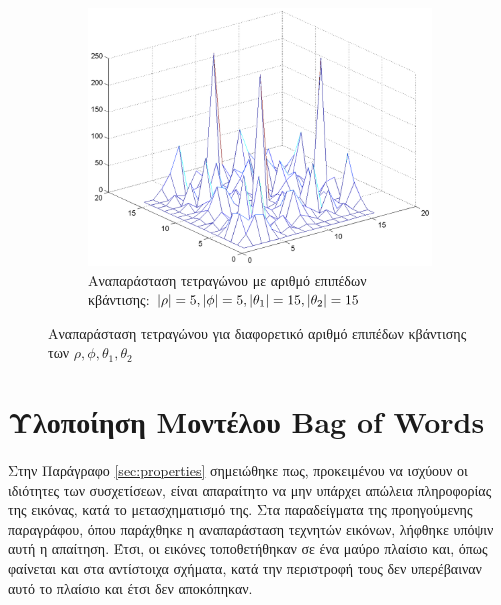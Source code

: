 \begin{figure}
\ContinuedFloat
        \centering
        \begin{subfigure}[b]{1\textwidth}
                \centerline{\includegraphics[scale = 0.35]{./images/examples/smallerTetragwno(551515).png}}
                \caption{Αναπαράσταση τετραγώνου με αριθμό επιπέδων κβάντισης: $\lvert\rho\rvert = 5,\lvert\phi\rvert = 5,\lvert\theta_1\rvert = 15,\lvert\theta_2\rvert = 15$}
        \end{subfigure}%
        \caption{Αναπαράσταση τετραγώνου για διαφορετικό αριθμό επιπέδων κβάντισης των $\rho,\phi,\theta_1,\theta_2$}
        \label{fig:diff}
\end{figure}


\section{Υλοποίηση Μοντέλου Bag of Words} \label{sec:real}
\paragraph*{}
Στην Παράγραφο \ref{sec:properties} σημειώθηκε πως, προκειμένου να ισχύουν οι ιδιότητες των συσχετίσεων, είναι απαραίτητο να μην υπάρχει απώλεια πληροφορίας της εικόνας, κατά το μετασχηματισμό της. Στα παραδείγματα της προηγούμενης παραγράφου, όπου παράχθηκε η αναπαράσταση τεχνητών εικόνων, λήφθηκε υπόψιν αυτή η απαίτηση. Έτσι, οι εικόνες τοποθετήθηκαν σε ένα μαύρο πλαίσιο και, όπως φαίνεται και στα αντίστοιχα σχήματα, κατά την περιστροφή τους δεν υπερέβαιναν αυτό το πλαίσιο και έτσι δεν αποκόπηκαν.

